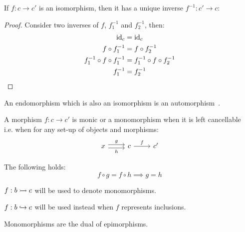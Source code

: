 \begin{theorem}
  If $f: c\to c'$ is an isomorphism, then it has a unique inverse $f^{-1}:c'\to
  c$:
  \begin{proof}
    Consider two inverses of $f$, $f^{-1}_1$ and $f^{-1}_2$, then:
    \[
      \begin{aligned}
        \mathrm{id}_c &= \mathrm{id}_c\\
        f\circ f^{-1}_1 &= f\circ f^{-1}_2\\
        f^{-1}_1 \circ f \circ f^{-1}_1 &= f^{-1}_1 \circ f \circ f^{-1}_2\\
        f^{-1}_1 &= f^{-1}_2
      \end{aligned}
    \]
  \end{proof}
\end{theorem}

\begin{definition}
  An endomorphism which is also an isomorphism is an
  automorphism~\parencite{riehl:category_theory_in_context}.
\end{definition}

\begin{definition}
  A morphism $f:c\to c'$ is monic or a monomorphism when it is left
  cancellable~\parencite{lane:working_mathematician} i.e. when for any
  set-up of objects and morphisms:
  \[\begin{tikzcd}[ampersand replacement=\&]
    x \& c \& {c'}
    \arrow["f", from=1-2, to=1-3]
    \arrow["g", shift left=1, from=1-1, to=1-2]
    \arrow["h"', shift right=1, from=1-1, to=1-2]
  \end{tikzcd}\]

  The following holds:
  \[f \circ g = f \circ h \implies g = h\]
\end{definition}

\begin{remark}
  $f:b\rightarrowtail c$ will be used to denote monomorphisms.
\end{remark}

\begin{remark}
  $f:b\hookrightarrow c$ will be used instead when $f$ represents inclusions.
\end{remark}

\begin{remark}
  Monomorphisms are the dual of epimorphisms.
\end{remark}

